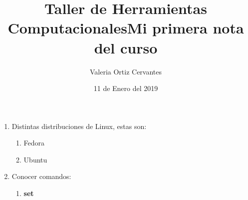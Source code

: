 \documentclass[letterpaper, 12pt, oneside]{article} %
\title{\Huge Taller de Herramientas Computacionales}
\author{Valeria Ortiz Cervantes}
\date{11 de Enero del 2019}
\begin{document}
	
	\maketitle
	\newpage
	\title{\Huge Mi primera nota del curso\\}
	
	\begin{enumerate}
		\item Distintas distribuciones de Linux, estas son:
		\begin{enumerate}
			\item Fedora
			\item Ubuntu
		\end{enumerate}
		\item Conocer comandos:
		\begin{enumerate}
			\item
			\color{magenta}\textbf{set} 
		\end{enumerate}
	\end{enumerate}
	
\end{document}
